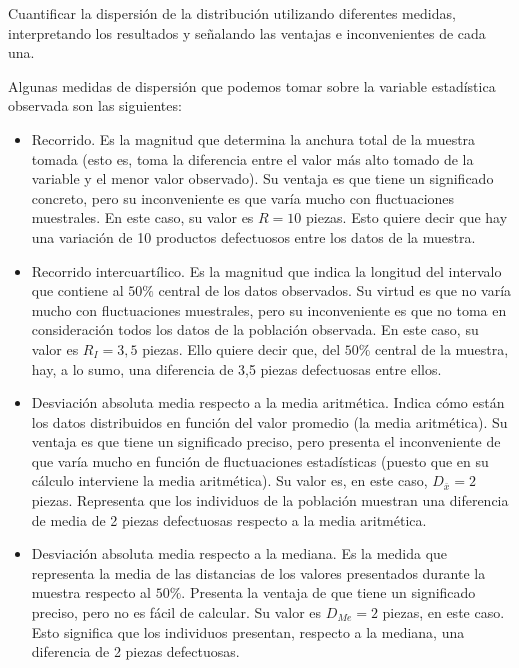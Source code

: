 \subproblem
Cuantificar la dispersi{\'o}n de la  distribuci{\'o}n utilizando diferentes
medidas, interpretando los resultados  y se{\~n}alando las ventajas e
inconvenientes de cada una.

Algunas medidas de dispersión que podemos tomar sobre la variable estadística observada son las siguientes:

\begin{itemize}
	
	\item Recorrido. Es la magnitud que determina la anchura total de la muestra tomada (esto es, toma la diferencia entre el valor más alto tomado de la variable y el menor valor observado). Su ventaja es que tiene un significado concreto, pero su inconveniente es que varía mucho con fluctuaciones muestrales. En este caso, su valor es $R = 10$ piezas. Esto quiere decir que hay una variación de 10 productos defectuosos entre los datos de la muestra.
	
	\item Recorrido intercuartílico. Es la magnitud que indica la longitud del intervalo que contiene al $50\%$ central de los datos observados. Su virtud es que no varía mucho con fluctuaciones muestrales, pero su inconveniente es que no toma en consideración todos los datos de la población observada. En este caso, su valor es $R_{I} = 3,5$ piezas. Ello quiere decir que, del $50\%$ central de la muestra, hay, a lo sumo, una diferencia de 3,5 piezas defectuosas entre ellos.
	
	\item Desviación absoluta media respecto a la media aritmética. Indica cómo están los datos distribuidos en función del valor promedio (la media aritmética). Su ventaja es que tiene un significado preciso, pero presenta el inconveniente de que varía mucho en función de fluctuaciones estadísticas (puesto que en su cálculo interviene la media aritmética). Su valor es, en este caso, $D_{\bar x} = 2$ piezas. Representa que los individuos de la población muestran una diferencia de media de 2 piezas defectuosas respecto a la media aritmética.
	
	\item Desviación absoluta media respecto a la mediana. Es la medida que representa la media de las distancias de los valores presentados durante la muestra respecto al $50\%$. Presenta la ventaja de que tiene un significado preciso, pero no es fácil de calcular. Su valor es $D_{Me} = 2$ piezas, en este caso. Esto significa que los individuos presentan, respecto a la mediana, una diferencia de 2 piezas defectuosas.
	

\end{itemize}
